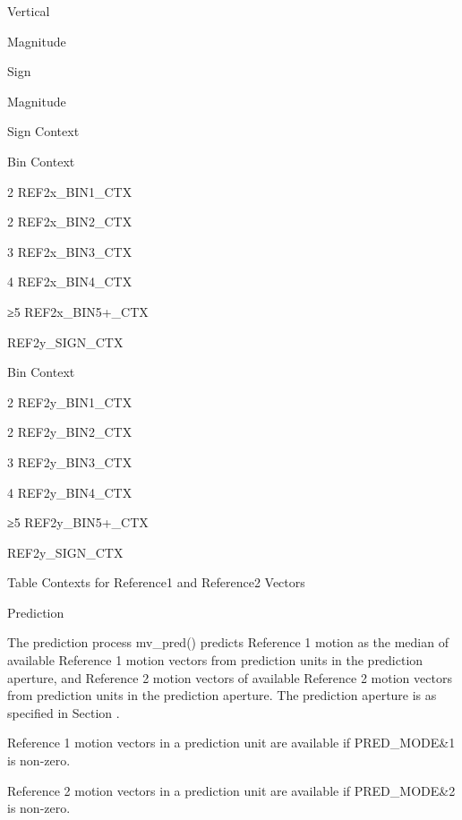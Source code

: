 Vertical

Magnitude

Sign

Magnitude

Sign Context

Bin   Context

2        REF2x\_BIN1\_CTX

2        REF2x\_BIN2\_CTX

3        REF2x\_BIN3\_CTX

4        REF2x\_BIN4\_CTX

≥5      REF2x\_BIN5+\_CTX

REF2y\_SIGN\_CTX         



Bin   Context

2        REF2y\_BIN1\_CTX

2        REF2y\_BIN2\_CTX

3        REF2y\_BIN3\_CTX

4        REF2y\_BIN4\_CTX

≥5      REF2y\_BIN5+\_CTX

REF2y\_SIGN\_CTX         


Table   Contexts for Reference1 and Reference2 Vectors

Prediction

The prediction process mv\_pred() predicts Reference 1 motion as the
median of available Reference 1 motion vectors from prediction units in
the prediction aperture, and Reference 2 motion vectors of available
Reference 2 motion vectors from prediction units in the prediction
aperture. The prediction aperture is as specified in Section .

Reference 1 motion vectors in a prediction unit are available if
PRED\_MODE\&1 is non-zero.

Reference 2 motion vectors in a prediction unit are available if
PRED\_MODE\&2 is non-zero.


